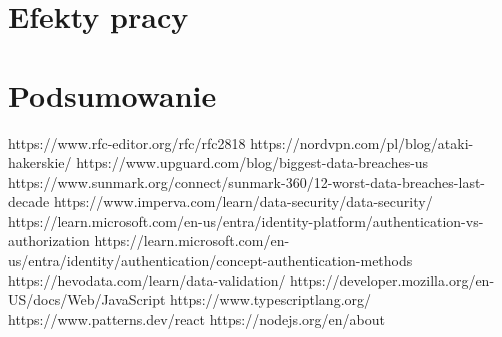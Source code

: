 \documentclass[12pt,twoside]{article}
\begin{document}
\section{Efekty pracy}
\section{Podsumowanie}



\begin{thebibliography}{4}
     https://www.rfc-editor.org/rfc/rfc2818
     https://nordvpn.com/pl/blog/ataki-hakerskie/
     https://www.upguard.com/blog/biggest-data-breaches-us
     https://www.sunmark.org/connect/sunmark-360/12-worst-data-breaches-last-decade
     https://www.imperva.com/learn/data-security/data-security/
     https://learn.microsoft.com/en-us/entra/identity-platform/authentication-vs-authorization
     https://learn.microsoft.com/en-us/entra/identity/authentication/concept-authentication-methods
     https://hevodata.com/learn/data-validation/
     https://developer.mozilla.org/en-US/docs/Web/JavaScript
     https://www.typescriptlang.org/
     https://www.patterns.dev/react
     https://nodejs.org/en/about


\end{thebibliography}

\clearpage

\makesummary
\end{document}
